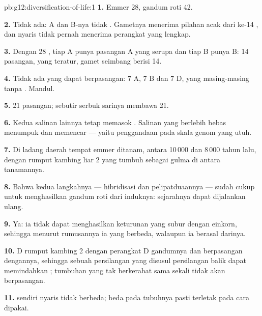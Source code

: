 \begin{solution}{pb:g12:diversification-of-life:1}
\textbf{1.} Emmer 28, gandum roti 42.

\textbf{2.} Tidak ada:  A dan B-nya tidak . Gametnya
menerima pilahan acak dari ke-14 , dan nyaris tidak pernah
menerima perangkat yang lengkap.

\textbf{3.} Dengan 28 , tiap A punya pasangan A yang serupa dan
tiap B punya B: 14 pasangan,  yang teratur, gamet seimbang
berisi 14.

\textbf{4.} Tidak ada yang dapat berpasangan: 7  A, 7 B dan 7
D, yang masing-masing tanpa . Mandul.

\textbf{5.} 21 pasangan; sebutir serbuk sarinya membawa 21.

\textbf{6.} Kedua salinan lainnya tetap memasok . Salinan
yang berlebih bebas menumpuk  dan memencar --- yaitu penggandaan
pada skala genom yang utuh.

\textbf{7.} Di ladang daerah tempat emmer ditanam, antara 10\,000 dan
8\,000 tahun lalu, dengan rumput kambing liar 2 yang tumbuh sebagai
gulma di antara tanamannya.

\textbf{8.} Bahwa kedua langkahnya --- hibridisasi dan pelipatduaannya
--- sudah cukup untuk menghasilkan gandum roti dari induknya:
sejarahnya dapat dijalankan ulang.

\textbf{9.} Ya: ia tidak dapat menghasilkan keturunan yang subur
dengan einkorn, sehingga menurut rumusannya ia  yang berbeda,
walaupun ia berasal darinya.

\textbf{10.}  D rumput kambing 2  dengan perangkat D
gandumnya dan berpasangan dengannya, sehingga sebuah persilangan yang
disusul persilangan balik dapat memindahkan ;  tumbuhan
yang tak berkerabat sama sekali tidak akan berpasangan.

\textbf{11.}  sendiri nyaris tidak berbeda; beda pada tubuhnya
pasti terletak pada cara  dipakai.


\end{solution}
